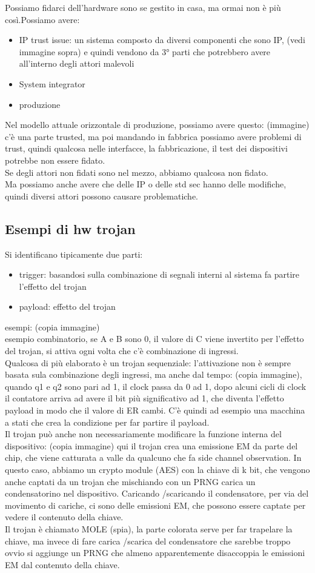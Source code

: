 \documentclass[oneside, 12pt]{extbook}
\begin{document}
Possiamo fidarci dell'hardware sono se gestito in casa, ma ormai non è più così.Possiamo avere:
\begin{itemize}
	\item IP trust issue: un sistema composto da diversi componenti che sono IP, (vedi immagine sopra) e quindi vendono da 3° parti che potrebbero avere all'interno degli attori malevoli
	\item System integrator
	\item produzione
\end{itemize}
Nel modello attuale orizzontale di produzione, possiamo avere questo: (immagine)\\c'è una parte trusted, ma poi mandando in fabbrica possiamo avere problemi di trust, quindi qualcosa nelle interfacce, la fabbricazione, il test dei dispositivi potrebbe non essere fidato.\\Se degli attori non fidati sono nel mezzo, abbiamo qualcosa non fidato.\\Ma possiamo anche avere che delle IP o delle std sec hanno delle modifiche, quindi diversi attori possono causare problematiche.
\subsection{Esempi di hw trojan}
Si identificano tipicamente due parti:
\begin{itemize}
	\item trigger: basandosi sulla combinazione di segnali interni al sistema fa partire l'effetto del trojan
	\item payload: effetto del trojan
\end{itemize}
esempi: (copia immagine)\\esempio combinatorio, se A e B sono 0, il valore di C viene invertito per l'effetto del trojan, si attiva ogni volta che c'è combinazione di ingressi.\\Qualcosa di più elaborato è un trojan sequenziale: l'attivazione non è sempre basata sula combinazione degli ingressi, ma anche dal tempo: (copia immagine), quando q1 e q2 sono pari ad 1, il clock passa da 0 ad 1, dopo alcuni cicli di clock il contatore arriva ad avere il bit più significativo ad 1, che diventa l'effetto payload in modo che il valore di ER cambi. C'è quindi ad esempio una macchina a stati che crea la condizione per far partire il payload.\\Il trojan può anche non necessariamente modificare la funzione interna del dispositivo: (copia immagine) qui il trojan crea una emissione EM da parte del chip, che viene catturata a valle da qualcuno che fa side channel observation. In questo caso, abbiamo un crypto module (AES) con la chiave di k bit, che vengono anche captati da un trojan che mischiando con un PRNG carica un condensatorino nel dispositivo. Caricando /scaricando il condensatore, per via del movimento di cariche, ci sono delle emissioni EM, che possono essere captate per vedere il contenuto della chiave.\\Il trojan è chiamato MOLE (spia), la parte colorata serve per far trapelare la chiave, ma invece di fare carica /scarica del condensatore che sarebbe troppo ovvio si aggiunge un PRNG che almeno apparentemente disaccoppia le emissioni EM dal contenuto della chiave.
\end{document}
